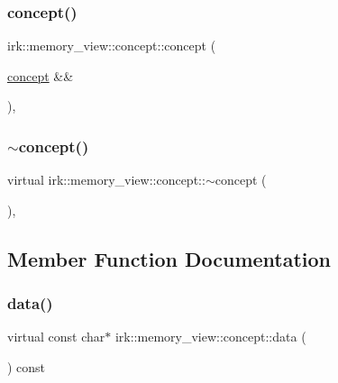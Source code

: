 \subsubsection{\texorpdfstring{concept()}{concept()}\hspace{0.1cm}{\footnotesize\ttfamily [3/3]}}
{\footnotesize\ttfamily irk\+::memory\+\_\+view\+::concept\+::concept (\begin{DoxyParamCaption}\item[{\mbox{\hyperlink{structirk_1_1memory__view_1_1concept}{concept}} \&\&}]{ }\end{DoxyParamCaption})\hspace{0.3cm}{\ttfamily [default]}, {\ttfamily [noexcept]}}

\mbox{\label{structirk_1_1memory__view_1_1concept_a970a71a31247472092552d2358968116}} 
\subsubsection{\texorpdfstring{$\sim$concept()}{~concept()}}
{\footnotesize\ttfamily virtual irk\+::memory\+\_\+view\+::concept\+::$\sim$concept (\begin{DoxyParamCaption}{ }\end{DoxyParamCaption})\hspace{0.3cm}{\ttfamily [virtual]}, {\ttfamily [default]}}



\subsection{Member Function Documentation}
\mbox{\label{structirk_1_1memory__view_1_1concept_a9e124ac4016556f7cf7fd864dcc43a7c}} 
\subsubsection{\texorpdfstring{data()}{data()}}
{\footnotesize\ttfamily virtual const char$\ast$ irk\+::memory\+\_\+view\+::concept\+::data (\begin{DoxyParamCaption}{ }\end{DoxyParamCaption}) const\hspace{0.3cm}{\ttfamily [pure virtual]}}



